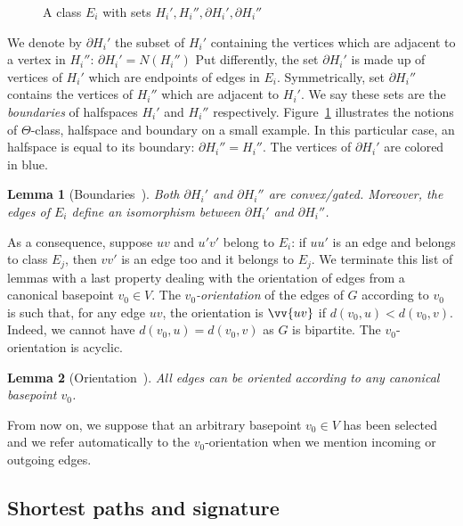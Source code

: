 \documentclass{article}
\newtheorem{lemma}{Lemma}
\begin{document}
\begin{figure}[h]
\centering
\scalebox{0.85}{}
\caption{A class $E_i$ with sets $H_i', H_i'', \partial H_i', \partial H_i''$}
\label{fig:halfspaces}
\end{figure}

We denote by $\partial H_i'$ the subset of $H_i'$ containing the vertices which are adjacent to a vertex in $H_i''$: $\partial H_i' = N(H_i'')$ Put differently, the set $\partial H_i'$ is made up of vertices of $H_i'$ which are endpoints of edges in $E_i$. Symmetrically, set $\partial H_i''$ contains the vertices of $H_i''$ which are adjacent to $H_i'$. We say these sets are the \textit{boundaries} of halfspaces $H_i'$ and $H_i''$ respectively. Figure~\ref{fig:halfspaces} illustrates the notions of $\Theta$-class, halfspace and boundary on a small example. In this particular case, an halfspace is equal to its boundary: $\partial H_i'' = H_i''$. The vertices of $\partial H_i'$ are colored in blue.

\begin{lemma}[Boundaries~\cite{BeChChVa20,HaImKl99,Mu80}]
Both $\partial H_i'$ and $\partial H_i''$ are convex/gated. Moreover, the edges of $E_i$ define an isomorphism between $\partial H_i'$ and $\partial H_i''$.
\label{le:boundaries}
\end{lemma}


As a consequence, suppose $uv$ and $u'v'$ belong to $E_i$: if $uu'$ is an edge and belongs to class $E_j$, then $vv'$ is an edge too and it belongs to $E_j$. We terminate this list of lemmas with a last property dealing with the orientation of edges  from a canonical basepoint $v_0 \in V$. The \textit{$v_0$-orientation} of the edges of $G$ according to $v_0$ is such that, for any edge $uv$, the orientation is $\vv{uv}$ if $d(v_0,u) < d(v_0,v)$. Indeed, we cannot have $d(v_0,u) = d(v_0,v)$ as $G$ is bipartite. The $v_0$-orientation is acyclic.

\begin{lemma}[Orientation~\cite{BeChChVa20}]
All edges can be oriented according to any canonical basepoint $v_0$.
\end{lemma}

From now on, we suppose that an arbitrary basepoint $v_0 \in V$ has been selected and we refer automatically to the $v_0$-orientation when we mention incoming or outgoing edges.

\subsection{Shortest paths and signature} \label{subsec:signature}
\end{document}
